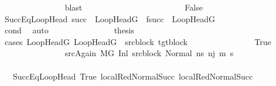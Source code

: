 \begin{isabellebody}
\ \ \ \ \ \ \ \ \ \ \ \ \ \ \isamarkupfalse%
\ blast\isanewline
\ \ \ \ \ \ \ \ \ \ \isamarkupfalse%
\isanewline
\ \ \ \ \ \ \ \ \ \ \ \ \isamarkupfalse%
\ False\isanewline
\ \ \ \ \ \ \ \ \ \ \ \ \isamarkupfalse%
\ SuccEqLoopHead{\isacharcolon}{\kern0pt}\ {\isachardoublequoteopen}succ\ {\isacharequal}{\kern0pt}\ LoopHeadG\ {\isasymand}\ f{\isacharparenleft}{\kern0pt}succ{\isacharparenright}{\kern0pt}\ {\isacharequal}{\kern0pt}\ LoopHeadG{\isacharprime}{\kern0pt}{\isachardoublequoteclose}\isanewline
\ \ \ \ \ \ \ \ \ \ \ \ \ \ \ \ \isamarkupfalse%
\ cond\ \isamarkupfalse%
\ auto\isanewline
\ \ \ \ \ \ \ \ \ \ \ \ \isamarkupfalse%
\ \isamarkupfalse%
\ {\isacharquery}{\kern0pt}thesis\ \isanewline
\ \ \ \ \ \ \ \ \ \ \ \ \isamarkupfalse%
\ {\isacharparenleft}{\kern0pt}cases\ {\isachardoublequoteopen}{\isacharparenleft}{\kern0pt}LoopHeadG{\isacharcomma}{\kern0pt}\ LoopHeadG{\isacharprime}{\kern0pt}{\isacharparenright}{\kern0pt}\ {\isacharequal}{\kern0pt}\ {\isacharparenleft}{\kern0pt}src{\isacharunderscore}{\kern0pt}block{\isacharcomma}{\kern0pt}\ tgt{\isacharunderscore}{\kern0pt}block{\isacharparenright}{\kern0pt}{\isachardoublequoteclose}{\isacharparenright}{\kern0pt}\isanewline
\ \ \ \ \ \ \ \ \ \ \ \ \ \ \isamarkupfalse%
\ True\isanewline
\ \ \ \ \ \ \ \ \ \ \ \ \ \ \isamarkupfalse%
\ srcAgain{\isacharcolon}{\kern0pt}\ {\isachardoublequoteopen}M{\isacharcomma}{\kern0pt}{\isasymLambda}{\isacharcomma}{\kern0pt}{\isasymGamma}{\isacharcomma}{\kern0pt}{\isasymOmega}{\isacharcomma}{\kern0pt}G\ {\isasymturnstile}{\isacharparenleft}{\kern0pt}Inl\ src{\isacharunderscore}{\kern0pt}block{\isacharcomma}{\kern0pt}\ Normal\ ns{\isacharprime}{\kern0pt}{\isacharparenright}{\kern0pt}\ {\isacharminus}{\kern0pt}n{\isasymrightarrow}{\isacharcircum}{\kern0pt}{\isacharparenleft}{\kern0pt}j{\isacharminus}{\kern0pt}{}{\isacharparenright}{\kern0pt}\ {\isacharparenleft}{\kern0pt}m{\isacharprime}{\kern0pt}{\isacharcomma}{\kern0pt}\ s{\isacharprime}{\kern0pt}{\isacharparenright}{\kern0pt}{\isachardoublequoteclose}\isanewline
\ \ \ \ \ \ \ \ \ \ \ \ \ \ \ \ \isamarkupfalse%
\ {\isachardoublequoteopen}{}{\isachardoublequoteclose}{\isacharparenleft}{\kern0pt}{}{\isacharparenright}{\kern0pt}\ {\isachardoublequoteopen}{}{\isachardoublequoteclose}{\isacharparenleft}{\kern0pt}{}{\isacharparenright}{\kern0pt}\ SuccEqLoopHead\ True\ local{\isachardot}{\kern0pt}RedNormalSucc{\isacharparenleft}{\kern0pt}{}{\isacharparenright}{\kern0pt}\ local{\isachardot}{\kern0pt}RedNormalSucc{\isacharparenleft}{\kern0pt}{}{\isacharparenright}{\kern0pt}\ \isamarkupfalse%

\end{isabellebody}
